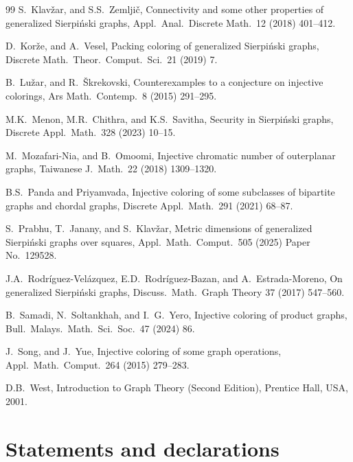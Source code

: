 \documentclass{article}
\begin{document}
\begin{thebibliography}{99}
 S.~Klav\v zar, and S.S.~Zemlji\v{c}, Connectivity and some other properties of generalized Sierpi\'{n}ski graphs, Appl.\ Anal.\ Discrete Math.\ 12 (2018) 401--412.


D.~Kor\v{z}e, and A.~Vesel, Packing coloring of generalized Sierpi\'nski graphs, Discrete Math.\ Theor.\ Comput.\ Sci.\  21 (2019) 7.


 B.~Lu\v{z}ar, and R.~\v{S}krekovski, Counterexamples to a conjecture on injective colorings, Ars Math.\ Contemp.\ 8 (2015) 291--295.


M.K.~Menon, M.R.~Chithra, and K.S.~Savitha,  Security in {S}ierpi\'nski graphs, Discrete Appl.\ Math.\  328 (2023) 10--15. 


 M.~Mozafari-Nia, and B.~Omoomi, Injective chromatic number of outerplanar graphs,
Taiwanese J.\ Math.\ 22 (2018) 1309--1320.


 B.S.~Panda and Priyamvada, Injective coloring of some subclasses of bipartite graphs and chordal graphs, Discrete Appl.\ Math.\ 291 (2021) 68--87.

 S.~Prabhu, T.~Janany, and S.~Klav\v{z}ar, Metric dimensions of generalized Sierpi\'{n}ski graphs over squares, Appl.\ Math.\ Comput.\ 505 (2025) Paper No.\ 129528.

 J.A.~Rodr\'{i}guez-Vel\'{a}zquez, E.D.~Rodr\'{i}guez-Bazan, and A.~Estrada-Moreno,
On generalized Sierpi\'{n}ski graphs, Discuss.\ Math.\ Graph Theory 37 (2017) 547--560.

 B.~Samadi, N.~Soltankhah, and I.~G.~Yero, Injective coloring of product graphs, Bull.\ Malays.\ Math.\ Sci.\ Soc.\  47 (2024) 86.
 

 J.~Song, and J.~Yue, Injective coloring of some graph operations, Appl.\ Math.\ Comput.\  264 (2015) 279--283.

 D.B.~West, Introduction to Graph Theory (Second Edition), Prentice Hall, USA, 2001.

\end{thebibliography}



\section*{Statements and declarations}
\end{document}
